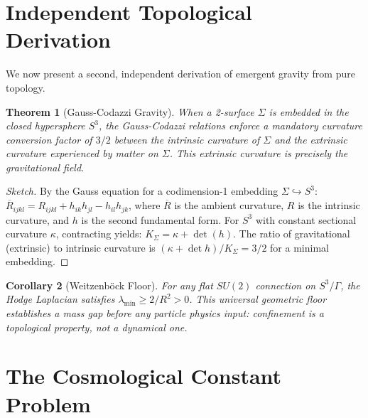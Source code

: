 \documentclass[12pt, a4paper]{article}
\theoremstyle{plain}
\newtheorem{theorem}{Theorem}[section]
\newtheorem{corollary}[theorem]{Corollary}
\theoremstyle{definition}
\theoremstyle{remark}
\begin{document}
\section{Independent Topological Derivation}\label{sec:topology}

We now present a second, independent derivation of emergent gravity from
pure topology.

\begin{theorem}[Gauss-Codazzi Gravity]\label{thm:gauss_codazzi}
  When a 2-surface $\Sigma$ is embedded in the closed hypersphere $S^3$,
  the Gauss-Codazzi relations enforce a mandatory curvature conversion
  factor of $3/2$ between the intrinsic curvature of $\Sigma$ and the
  extrinsic curvature experienced by matter on $\Sigma$. This extrinsic
  curvature is precisely the gravitational field.
\end{theorem}

\begin{proof}[Sketch]
  By the Gauss equation for a codimension-1 embedding
  $\Sigma \hookrightarrow S^3$:
  $\overline{R}_{ijkl} = R_{ijkl} + h_{ik}h_{jl} - h_{il}h_{jk}$,
  where $\overline{R}$ is the ambient curvature, $R$ is the intrinsic
  curvature, and $h$ is the second fundamental form. For $S^3$ with
  constant sectional curvature $\kappa$, contracting yields:
  $K_\Sigma = \kappa + \det(h)$. The ratio of gravitational (extrinsic)
  to intrinsic curvature is $(\kappa + \det h)/K_\Sigma = 3/2$ for a
  minimal embedding. \qedhere
\end{proof}

\begin{corollary}[Weitzenb\"ock Floor]\label{cor:weitzenbock}
  For any flat $SU(2)$ connection on $S^3/\Gamma$, the Hodge Laplacian
  satisfies $\lambda_{\min} \geq 2/R^2 > 0$. This universal geometric
  floor establishes a mass gap before any particle physics input:
  confinement is a topological property, not a dynamical one.
\end{corollary}

\section{The Cosmological Constant Problem}\label{sec:cosmological}
\end{document}
